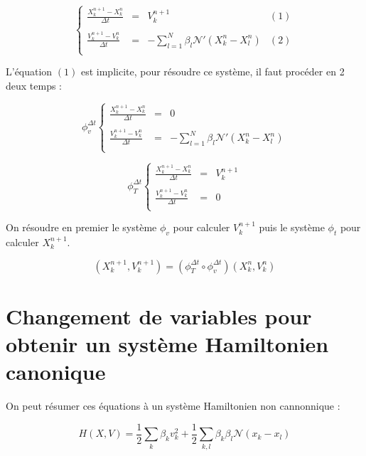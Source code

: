 \documentclass[a4paper,11pt]{article}
\begin{document}
$$
\left\lbrace
\begin{array}{rclr}

\frac{X_k^{n+1} - X_k^n}{\Delta t} &=& V_k^{n+1} & (1) \\ \\
\frac{V_k^{n+1} - V_k^n}{\Delta t} &=& - \sum\limits_{l = 1}^N \beta_l  \mathcal{N}'(X_k^n-X_l^n) & (2)\\

\end{array} \right.
$$

L'équation $(1)$ est implicite, pour résoudre ce système, il faut procéder en 2 deux temps :

$$
\phi _ v ^{\Delta t} \left\lbrace
\begin{array}{rclr}

\frac{X_k^{n+1} - X_k^n}{\Delta t} &=& 0  \\ \\
\frac{V_k^{n+1} - V_k^n}{\Delta t} &=& - \sum\limits_{l = 1}^N \beta_l  \mathcal{N}'(X_k^n-X_l^n)\\

\end{array} \right.
$$

$$
\phi _T ^{\Delta t}  \left\lbrace
\begin{array}{rclr}

\frac{X_k^{n+1} - X_k^n}{\Delta t} &=& V_k^{n+1} \\ \\
\frac{V_k^{n+1} - V_k^n}{\Delta t} &=& 0\\

\end{array} \right.
$$

On résoudre en premier le système $\phi _v$ pour calculer $V_k^{n+1}$ puis le système $\phi _t$ pour calculer $X_k^{n+1}$.

$$
(X_k^{n+1}, V_k^{n+1}) = (\phi_T^{\Delta t} \circ \phi_v^{\Delta t}) (X_k^{n}, V_k^{n})
$$

\section{Changement de variables pour obtenir un système Hamiltonien canonique}

On peut résumer ces équations à un système Hamiltonien non cannonnique :

$$
H(X,V) = \frac{1}{2} \sum \limits_{k} \beta_k v_k^2 + \frac{1}{2} \sum \limits _{k, l} \beta_k \beta_l \mathcal{N}(x_k - x_l)
$$
\end{document}
